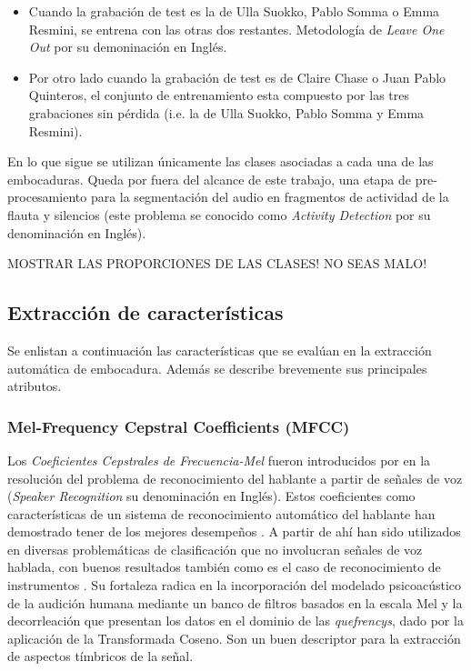 \documentclass{article}
\begin{document}
\begin{itemize} 
  \item Cuando la grabación de test es la de Ulla Suokko, Pablo Somma o Emma Resmini, se entrena con las otras dos restantes. Metodología de \textit{Leave One Out} por su demoninación en Inglés.
  \item Por otro lado cuando la grabación de test es de Claire Chase o Juan Pablo Quinteros, el conjunto de entrenamiento esta compuesto por las tres grabaciones sin pérdida (i.e. la de Ulla Suokko, Pablo Somma y Emma Resmini).
\end{itemize}

En lo que sigue se utilizan únicamente las clases asociadas a cada una de las embocaduras. Queda por fuera del alcance de este trabajo, una etapa de pre-procesamiento para la segmentación del audio en fragmentos de actividad de la flauta y silencios (este problema se conocido como \textit{Activity Detection} por su denominación en Inglés). 
\medskip 

MOSTRAR LAS PROPORCIONES DE LAS CLASES! NO SEAS MALO!

\subsection{Extracción de características}
\label{descriptores}
Se enlistan a continuación las características que se evalúan en la extracción automática de embocadura. Además se describe brevemente sus principales atributos.



\subsubsection{Mel-Frequency Cepstral Coefficients (MFCC)} 

Los \textit{Coeficientes Cepstrales de Frecuencia-Mel} fueron introducidos por \cite{davis1980comparison} en la resolución del problema de reconocimiento del hablante a partir de señales de voz (\textit{Speaker Recognition} su denominación en Inglés). Estos coeficientes como características de un sistema de reconocimiento automático del hablante han demostrado tener de los mejores desempeños \citep[Capítulo~14]{quatieri2002discrete}. A partir de ahí han sido utilizados en diversas problemáticas de clasificación que no involucran señales de voz hablada, con buenos resultados también como es el caso de reconocimiento de instrumentos \citep[Capítulo~6]{klapuri2007signal}. Su fortaleza radica en la incorporación del modelado psicoacústico de la audición humana mediante un banco de filtros basados en la escala Mel \citep{stevens1937scale} y la decorrleación que presentan los datos en el dominio de las \textit{quefrencys}, dado por la aplicación de la Transformada Coseno. Son un buen descriptor para la extracción de aspectos tímbricos de la señal.
\medskip
\end{document}
